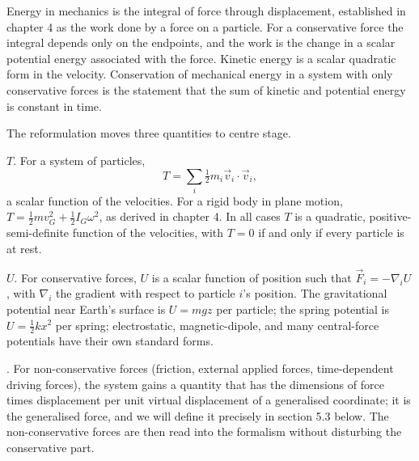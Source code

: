 Energy in mechanics is the integral of force through displacement,
established in chapter 4 as the work done by a force on a particle.
For a conservative force the integral depends only on the endpoints,
and the work is the change in a scalar potential energy associated
with the force. Kinetic energy is a scalar quadratic form in the
velocity. Conservation of mechanical energy in a system with only
conservative forces is the statement that the sum of kinetic and
potential energy is constant in time.

The reformulation moves three quantities to centre stage.

 $T$. For a system of particles,
\[
T = \sum_i \tfrac{1}{2} m_i \vec{v}_i \cdot \vec{v}_i,
\]
a scalar function of the velocities. For a rigid body in plane motion,
$T = \tfrac{1}{2} m v_G^2 + \tfrac{1}{2} I_G \omega^2$, as derived in
chapter 4. In all cases $T$ is a quadratic, positive-semi-definite
function of the velocities, with $T = 0$ if and only if every particle
is at rest.

 $U$. For conservative forces, $U$ is a
scalar function of position such that $\vec{F}_i = -\nabla_i U$, with
$\nabla_i$ the gradient with respect to particle $i$'s position. The
gravitational potential near Earth's surface is $U = mgz$ per particle;
the spring potential is $U = \tfrac{1}{2}k x^2$ per spring;
electrostatic, magnetic-dipole, and many central-force potentials have
their own standard forms.

. For non-conservative forces (friction,
external applied forces, time-dependent driving forces), the system
gains a quantity that has the dimensions of force times displacement
per unit virtual displacement of a generalised coordinate; it is the
generalised force, and we will define it precisely in section 5.3
below. The non-conservative forces are then read into the formalism
without disturbing the conservative part.

